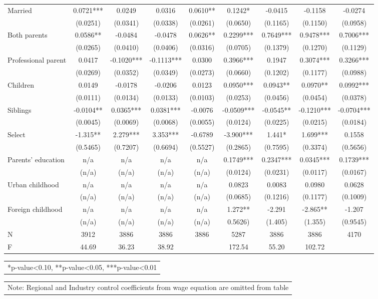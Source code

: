 \documentclass[12pt]{report}
\begin{document}
\begin{sidewaystable}
\begin{tabular}{lc|c|c|c|c|c|c|c}
Married & 0.0721*** & 0.0249 & 0.0316 & 0.0610** & 0.1242* & -0.0415 & -0.1158 & -0.0274\\
& (0.0251) & (0.0341) & (0.0338) & (0.0261) & (0.0650) & (0.1165) & (0.1150) & (0.0958)\\
Both parents & 0.0586** & -0.0484 & -0.0478 & 0.0626** & 0.2299*** & 0.7649*** & 0.9478*** & 0.7006***\\
& (0.0265) & (0.0410) & (0.0406) & (0.0316) & (0.0705) & (0.1379) & (0.1270) & (0.1129)\\
Professional parent & 0.0417 & -0.1020*** & -0.1113*** & 0.0300 & 0.3966*** & 0.1947 & 0.3074*** & 0.3266***\\
& (0.0269) & (0.0352) & (0.0349) & (0.0273) & (0.0660) & (0.1202) & (0.1177) & (0.0988)\\
Children & 0.0149 & -0.0178 & -0.0206 & 0.0123 & 0.0950*** & 0.0943** & 0.0970** & 0.0992***\\
& (0.0111) & (0.0134) & (0.0133) & (0.0103) & (0.0253) & (0.0456) & (0.0454) & (0.0378)\\
Siblings & -0.0104** & 0.0365*** & 0.0381*** & -0.0076 & -0.0509*** & -0.0545** & -0.1210*** & -0.0704***\\
& (0.0045) & (0.0069) & (0.0068) & (0.0055) & (0.0124) & (0.0225) & (0.0215) & (0.0184)\\
Select & -1.315** & 2.279*** & 3.353*** & -0.6789 & -3.900*** & 1.441* & 1.699*** & 0.1558\\
& (0.5465) & (0.7207) & (0.6694) & (0.5527) & (0.2865) & (0.7595) & (0.3374) & (0.5656)\\
Parents' education & n/a & n/a & n/a & n/a & 0.1749*** & 0.2347*** & 0.0345*** & 0.1739***\\
& (n/a) & (n/a) & (n/a) & (n/a) & (0.0124) & (0.0231) & (0.0117) & (0.0167)\\
Urban childhood & n/a & n/a & n/a & n/a & 0.0823 & 0.0083 & 0.0980 & 0.0628\\
& (n/a) & (n/a) & (n/a) & (n/a) & (0.0685) & (0.1216) & (0.1177) & (0.1009)\\
Foreign childhood & n/a & n/a & n/a & n/a & 1.272** & -2.291 & -2.865** & -1.207\\
& (n/a) & (n/a) & (n/a) & (n/a) & 0.5626) & (1.405) & (1.355) & (0.9545)\\
\hline
N & 3912 & 3886 & 3886 & 3886 & 5287 & 3886 & 3886 & 4170\\
F & 44.69 & 36.23 & 38.92 & & 172.54 & 55.20 & 102.72 & \\
\hline
\hline
\end{tabular}
\begin{tabular}{p{6.25in}}\footnotesize{
*p-value<0.10, **p-value<0.05, ***p-value<0.01}\\
\end{tabular}
\begin{tabular}{p{6.25in}}\footnotesize{
Note: Regional and Industry control coefficients from wage equation are omitted from table}\\
\end{tabular}
\end{sidewaystable}
\end{document}
